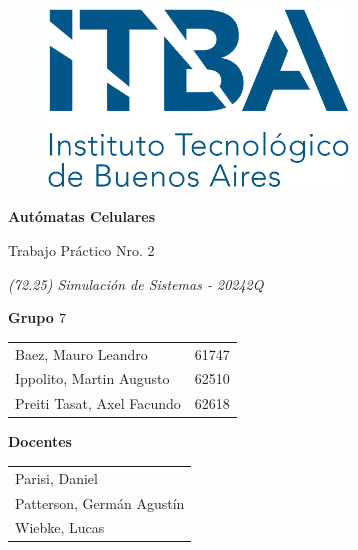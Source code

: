 \begin{titlepage}
    \centering

    \begin{figure}[H]
        \centering
        \includegraphics[width=8cm]{images/itba}
        \label{fig:logoitba}
    \end{figure}

    {
        \Large \bfseries Autómatas Celulares

        \vspace{0.1cm}

        Trabajo Práctico Nro. 2
        \vspace{0.2cm}
    }


    \large
    \textit{(72.25) Simulación de Sistemas - 20242Q}

    \vspace{1,5cm}

    \large


    \textbf{\large{Grupo $7$}}

    \begin{tabular}{l r}
        Baez, Mauro Leandro & 61747 \\
        Ippolito, Martin Augusto & 62510 \\
        Preiti Tasat, Axel Facundo & 62618 \\
    \end{tabular}

    \vspace{1,5cm}


    \textbf{\large{Docentes}}

    \vspace{0.2cm}

    \begin{tabular}{l}
        Parisi, Daniel \\
        Patterson, Germán Agustín \\
        Wiebke, Lucas \\
    \end{tabular}

    \vspace{1,5cm}


\end{titlepage}